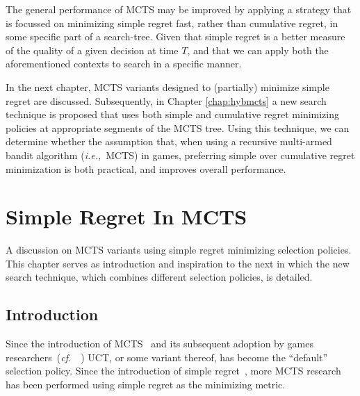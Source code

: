 \documentclass{kecsmstr}
\newcommand{\ie}{{\it i.e.,}~}
\newcommand{\cf}{{\it cf.}~}
\begin{document}
The general performance of MCTS may be improved by applying a strategy that is focussed on minimizing simple regret fast, rather than cumulative regret, in some specific part of a search-tree. Given that simple regret is a better measure of the quality of a given decision at time $T$, and that we can apply both the aforementioned contexts to search in a specific manner. 

In the next chapter, MCTS variants designed to (partially) minimize simple regret are discussed. Subsequently, in Chapter \ref{chap:hybmcts} a new search technique is proposed that uses both simple and cumulative regret minimizing policies at appropriate segments of the MCTS tree. Using this technique, we can determine whether the assumption that, when using a recursive multi-armed bandit algorithm (\ie MCTS) in games, preferring simple over cumulative regret minimization is both practical, and improves overall performance.

\chapter{Simple Regret In MCTS}
\label{chap:mctssr}

\begin{chaptercontents} A discussion on MCTS variants using simple regret minimizing selection policies. This chapter serves as introduction and inspiration to the next in which the new search technique, which combines different selection policies, is detailed.
\end{chaptercontents}

\section{Introduction}
Since the introduction of MCTS~ and its subsequent adoption by games researchers~(\cf~) UCT, or some variant thereof, has become the ``default'' selection policy. Since the introduction of simple regret~, more MCTS research has been performed using simple regret as the minimizing metric.
\end{document}
